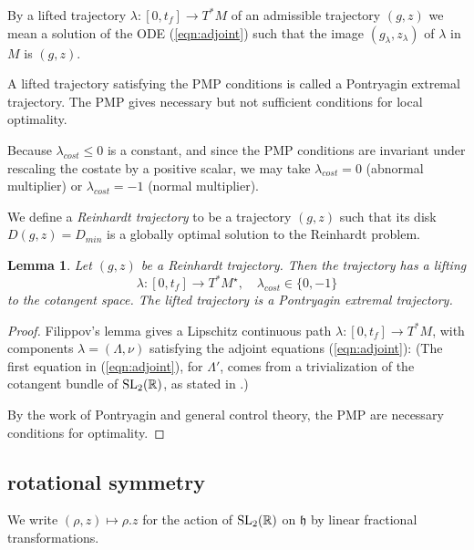 \documentclass{article}
\newtheorem{lemma}[theorem]{Lemma}
\theoremstyle{remark}
\newcommand{\ring}[1]{\mathbb{#1}}
\newcommand{\op}[1]{\hbox{#1}}
\def\SL{\op{SL}_2(\ring{R})}
\def\h{\mathfrak h}
\def\Mstar{M^\star}
\def\DR{D_{min}}
\begin{document}
By a lifted trajectory $\lambda:[0,t_f]\to T^*M$ of an admissible
trajectory $(g,z)$ we mean a solution of the ODE (\ref{eqn:adjoint})
such that the image $(g_\lambda,z_\lambda)$ of $\lambda$ in $M$ is
$(g,z)$.

A lifted trajectory satisfying the PMP conditions is called a
Pontryagin extremal trajectory.  The PMP gives necessary but not
sufficient conditions for local optimality.

Because $\lambda_{cost}\le 0$ is a constant, and since the PMP
conditions are invariant under rescaling the costate by a positive
scalar, we may take $\lambda_{cost}=0$ (abnormal multiplier) or
$\lambda_{cost}=-1$ (normal multiplier).

We define a {\it Reinhardt trajectory} to be a trajectory $(g,z)$ such
that its disk $D(g,z)=\DR$ is a globally optimal solution to the
Reinhardt problem.

\begin{lemma} Let $(g,z)$ be a Reinhardt trajectory.
Then the trajectory has a lifting
\[
\lambda:[0,t_f]\to T^*\Mstar, \quad\lambda_{cost}\in \{0,-1\}
\] to the cotangent space.  The lifted trajectory is a Pontryagin
extremal trajectory.
\end{lemma}


\begin{proof} 
  Filippov's lemma gives a Lipschitz continuous path
  $\lambda:[0,t_f]\to T^*M$, with components
  $\lambda=(\Lambda,\nu)$ satisfying the
  adjoint equations (\ref{eqn:adjoint}):
(The first equation in (\ref{eqn:adjoint}), for $\Lambda'$, comes from
a trivialization of the cotangent bundle of $\SL$, as stated in
\cite[Eqn.18.18]{agrachev2013control}.)

By the work of Pontryagin and general control theory, 
the PMP are necessary conditions
for optimality.
\end{proof}

\subsection{rotational symmetry}\label{sec:sym}

We write $(\rho,z)\mapsto \rho.z$ for the action of $\SL$ on $\h$ by
linear fractional transformations.
\end{document}
